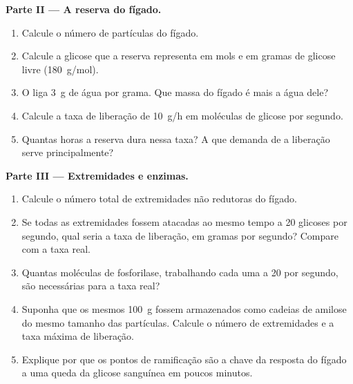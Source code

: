 \begin{problem}
\medskip
\noindent\textbf{Parte II --- A reserva do fígado.}
\begin{enumerate}[resume]
  \item Calcule o número de partículas do fígado.
  \item Calcule a glicose que a reserva representa em mols e em gramas
        de glicose livre (\qty{180}{g/mol}).
  \item O  liga \qty{3}{g} de água por grama. Que massa do
        fígado é  mais a água dele?
  \item Calcule a taxa de liberação de \qty{10}{g/h} em moléculas de
        glicose por segundo.
  \item Quantas horas a reserva dura nessa taxa? A que demanda de 
        a liberação serve principalmente?
\end{enumerate}

\medskip
\noindent\textbf{Parte III --- Extremidades e enzimas.}
\begin{enumerate}[resume]
  \item Calcule o número total de extremidades não redutoras do fígado.
  \item Se todas as extremidades fossem atacadas ao mesmo tempo a
        \qty{20}{} glicoses por segundo, qual seria a taxa de
        liberação, em gramas por segundo? Compare com a taxa real.
  \item Quantas moléculas de fosforilase, trabalhando cada uma a
        \qty{20}{} por segundo, são necessárias para a taxa real?
  \item Suponha que os mesmos \qty{100}{g} fossem armazenados como
        cadeias de amilose do mesmo tamanho das partículas. Calcule o
        número de extremidades e a taxa máxima de liberação.
  \item Explique por que os pontos de ramificação são a chave da
        resposta do fígado a uma queda da glicose sanguínea em poucos
        minutos.
\end{enumerate}


\end{problem}
